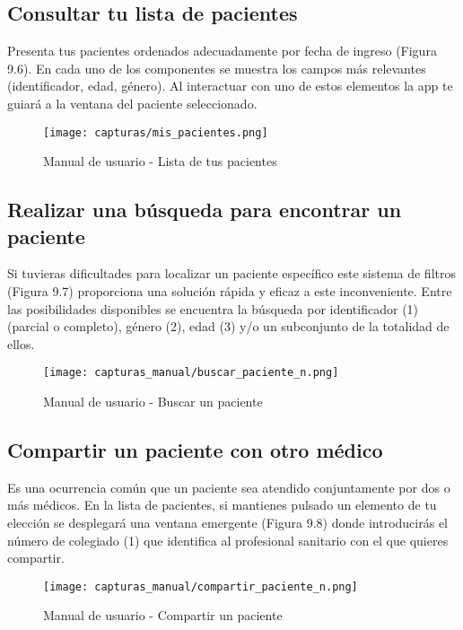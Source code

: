 \documentclass[11pt,spanish,
		listoftables,listoffigures]
		{tfgplantilla}
\begin{document}
\subsection {Consultar tu lista de pacientes}

Presenta tus pacientes ordenados adecuadamente por fecha de ingreso (Figura 9.6). En cada uno de los componentes se muestra los campos más relevantes (identificador, edad, género). Al interactuar con uno de estos elementos la app te guiará a la ventana del paciente seleccionado.

\begin{figure}[H]
\centering
\texttt{[image: capturas/mis\_pacientes.png]}
\caption{Manual de usuario - Lista de tus pacientes}
\end{figure}

\newpage
\subsection {Realizar una búsqueda para encontrar un paciente}

Si tuvieras dificultades para localizar un paciente específico este sistema de filtros (Figura 9.7) proporciona una solución rápida y eficaz a este inconveniente. Entre las posibilidades disponibles se encuentra la búsqueda por identificador (1) (parcial o completo), género (2), edad (3) y/o un subconjunto de la totalidad de ellos.

\begin{figure}[H]
\centering
\texttt{[image: capturas\_manual/buscar\_paciente\_n.png]}
\caption{Manual de usuario - Buscar un paciente}
\end{figure}

\subsection {Compartir un paciente con otro médico}

Es una ocurrencia común que un paciente sea atendido conjuntamente por dos o más médicos. En la lista de pacientes, si mantienes pulsado un elemento de tu elección se desplegará una ventana emergente (Figura 9.8) donde introducirás el número de colegiado (1) que identifica al profesional sanitario con el que quieres compartir.

\begin{figure}[H]
\centering
\texttt{[image: capturas\_manual/compartir\_paciente\_n.png]}
\caption{Manual de usuario - Compartir un paciente}
\end{figure}
\end{document}
